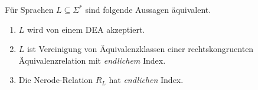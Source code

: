 
\begin{Satz} %
        Für Sprachen $L\subseteq \Sigma^*$ sind folgende Aussagen äquivalent.
        \begin{enumerate}
                \item\label{itm:Nerode1} $L$ wird von einem \ac{DEA} akzeptiert.
                \item\label{itm:Nerode2} $L$ ist Vereinigung von Äquivalenzklassen einer rechtskongruenten Äquivalenzrelation mit \emph{endlichem} Index.
                \item\label{itm:Nerode3} Die Nerode-Relation $R_L$ hat \emph{endlichen} Index.
                \qedhere
        \end{enumerate}
\end{Satz}

